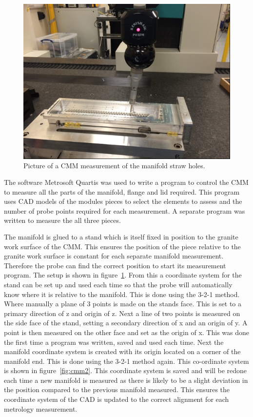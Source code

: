 \begin{figure}[ht]
\centering
\includegraphics[scale=1.3]{Figures/cmm1}
\decoRule
\caption{Picture of a CMM measurement of the manifold straw holes.}
\label{fig:cmm1}
\end{figure}

The software Metrosoft Quartis \cite{metrosoft} was used to write a program to control the CMM to measure all the parts of the manifold, flange and lid required. This program uses CAD models of the modules pieces to select the elements to assess and the number of probe points required for each measurement. A separate program was written to measure the all three pieces.

The manifold is glued to a stand which is itself fixed in position to the granite work surface of the CMM. This ensures the position of the piece relative to the granite work surface is constant for each separate manifold measurement. Therefore the probe can find the correct position to start its measurement program. The setup is shown in figure~\ref{fig:cmm1}. From this a coordinate system for the stand can be set up and used each time so that the probe will automatically know where it is relative to the manifold. This is done using the 3-2-1 method. Where manually a plane of 3 points is made on the stands face. This is set to a primary direction of z and origin of z. Next a line of two points is measured on the side face of the stand, setting a secondary direction of x and an origin of y. A point is then measured on the other face and set as the origin of x. This was done the first time a program was written, saved and used each time. Next the manifold coordinate system is created with its origin located on a corner of the manifold end. This is done using the 3-2-1 method again. This co-ordinate system is shown in figure~\ref{fig:cmm2}. This coordinate system is saved and will be redone each time a new manifold is measured as there is likely to be a slight deviation in the position compared to the previous manifold measured. This ensures the coordinate system of the CAD is updated to the correct alignment for each metrology measurement. 

